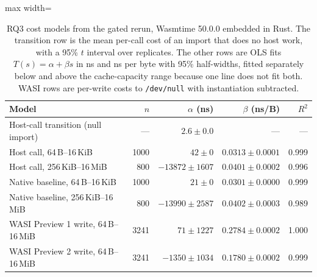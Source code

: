 \begin{table}[t]
\caption{RQ3 cost models from the gated rerun, Wasmtime 50.0.0 embedded in Rust. The transition row is the mean per-call cost of an import that does no host work, with a 95\% $t$ interval over replicates. The other rows are OLS fits $T(s)=\alpha+\beta s$ in ns and ns per byte with 95\% half-widths, fitted separately below and above the cache-capacity range because one line does not fit both. WASI rows are per-write costs to \texttt{/dev/null} with instantiation subtracted.}\label{tab:hostfit}
\footnotesize
\setlength{\tabcolsep}{4pt}%
\begin{adjustbox}{max width=\textwidth}%
\begin{tabular}{lrrrr}
\toprule
Model & $n$ & $\alpha$ (ns) & $\beta$ (ns/B) & $R^2$ \\
\midrule
Host-call transition (null import) & --- & $2.6 \pm 0.0$ & --- & --- \\
Host call, 64\,B--16\,KiB & 1000 & $42 \pm 0$ & $0.0313 \pm 0.0001$ & 0.999 \\
Host call, 256\,KiB--16\,MiB & 800 & $-13872 \pm 1607$ & $0.0401 \pm 0.0002$ & 0.996 \\
Native baseline, 64\,B--16\,KiB & 1000 & $21 \pm 0$ & $0.0301 \pm 0.0000$ & 0.999 \\
Native baseline, 256\,KiB--16\,MiB & 800 & $-13990 \pm 2587$ & $0.0402 \pm 0.0003$ & 0.989 \\
WASI Preview 1 write, 64\,B--16\,MiB & 3241 & $71 \pm 1227$ & $0.2784 \pm 0.0002$ & 1.000 \\
WASI Preview 2 write, 64\,B--16\,MiB & 3241 & $-1350 \pm 1034$ & $0.1780 \pm 0.0002$ & 0.999 \\
\bottomrule
\end{tabular}%
\end{adjustbox}
\end{table}
